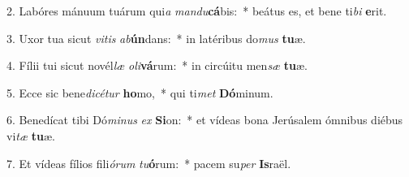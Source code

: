 2. Labóres mánuum tuárum qui\textit{a} \textit{man}\textit{du}\textbf{cá}bis:~*  beátus es, et bene ti\textit{bi} \textbf{e}rit.\

3. Uxor tua sicut \textit{vi}\textit{tis} \textit{ab}\textbf{ún}dans:~*  in latéribus do\textit{mus} \textbf{tu}æ.\

4. Fílii tui sicut novél\textit{læ} \textit{o}\textit{li}\textbf{vá}rum:~*  in circúitu men\textit{sæ} \textbf{tu}æ.\

5. Ecce sic bene\textit{di}\textit{cé}\textit{tur} \textbf{ho}mo,~*  qui ti\textit{met} \textbf{Dó}minum.\

6. Benedícat tibi Dó\textit{mi}\textit{nus} \textit{ex} \textbf{Si}on:~*  et vídeas bona Jerúsalem ómnibus diébus vi\textit{tæ} \textbf{tu}æ.\

7. Et vídeas fílios fili\textit{ó}\textit{rum} \textit{tu}\textbf{ó}rum:~*  pacem su\textit{per} \textbf{Is}raël.\

